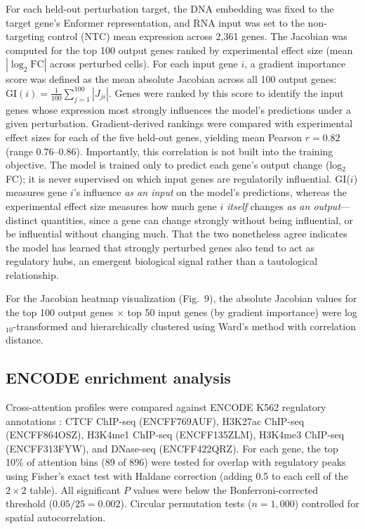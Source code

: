 \documentclass[12pt,a4paper]{article}
\begin{document}
For each held-out perturbation target, the DNA embedding was fixed to the target gene's Enformer representation, and RNA input was set to the non-targeting control (NTC) mean expression across 2,361 genes. The Jacobian was computed for the top 100 output genes ranked by experimental effect size (mean $|\log_2\text{FC}|$ across perturbed cells). For each input gene $i$, a gradient importance score was defined as the mean absolute Jacobian across all 100 output genes: $\text{GI}(i) = \frac{1}{100}\sum_{j=1}^{100}|J_{ji}|$. Genes were ranked by this score to identify the input genes whose expression most strongly influences the model's predictions under a given perturbation. Gradient-derived rankings were compared with experimental effect sizes for each of the five held-out genes, yielding mean Pearson $r = 0.82$ (range 0.76--0.86). Importantly, this correlation is not built into the training objective. The model is trained only to predict each gene's output change (log$_2$FC); it is never supervised on which input genes are regulatorily influential. GI($i$) measures gene $i$'s influence \textit{as an input} on the model's predictions, whereas the experimental effect size measures how much gene $i$ \textit{itself} changes \textit{as an output}---distinct quantities, since a gene can change strongly without being influential, or be influential without changing much. That the two nonetheless agree indicates the model has learned that strongly perturbed genes also tend to act as regulatory hubs, an emergent biological signal rather than a tautological relationship.

For the Jacobian heatmap visualization (Fig.~9), the absolute Jacobian values for the top 100 output genes $\times$ top 50 input genes (by gradient importance) were log$_{10}$-transformed and hierarchically clustered using Ward's method with correlation distance.

\subsection{ENCODE enrichment analysis}

\begin{sloppypar}
Cross-attention profiles were compared against ENCODE K562 regulatory
annotations \citep{encode2012}: CTCF ChIP-seq (ENCFF769AUF), H3K27ac ChIP-seq
(ENCFF864OSZ), H3K4me1 ChIP-seq (ENCFF135ZLM), H3K4me3 ChIP-seq
(ENCFF313FYW), and DNase-seq (ENCFF422QRZ).
For each gene, the top 10\% of attention bins (89 of 896) were tested
for overlap with regulatory peaks using Fisher's exact test with Haldane
correction (adding 0.5 to each cell of the $2 \times 2$ table).
All significant $P$ values were below the Bonferroni-corrected threshold
($0.05/25 = 0.002$). Circular permutation tests ($n = 1{,}000$)
controlled for spatial autocorrelation.
\end{sloppypar}
\end{document}
